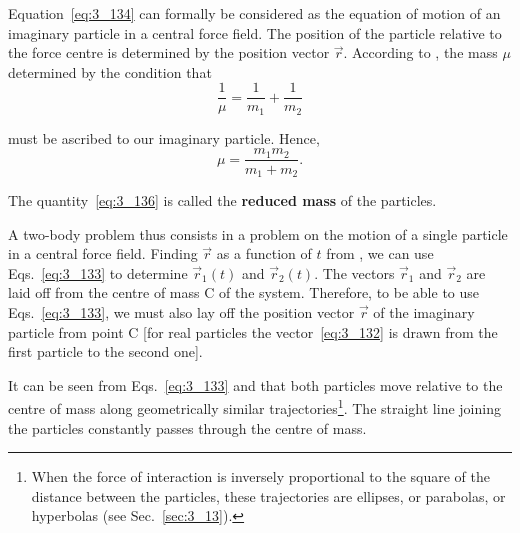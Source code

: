 \noindent
Equation~\eqref{eq:3_134} can formally be considered as the equation of motion of an imaginary particle in a central force field. The position of the particle relative to the force centre is determined by the position vector $\vec{r}$. According to , the mass $\mu$ determined by the condition that
\begin{equation}\label{eq:3_135}
\frac{1}{\mu} = \frac{1}{m_1} + \frac{1}{m_2}
\end{equation}

\noindent
must be ascribed to our imaginary particle. Hence,
\begin{equation}\label{eq:3_136}
\mu = \frac{m_1m_2}{m_1+m_2}.
\end{equation}

\noindent
The quantity~\eqref{eq:3_136} is called the \textbf{reduced mass} of the particles.

A two-body problem thus consists in a problem on the motion of a single particle in a central force field. Finding $\vec{r}$ as a function of $t$ from , we can use Eqs.~\eqref{eq:3_133} to determine $\vec{r}_1(t)$ and $\vec{r}_2(t)$. The vectors $\vec{r}_1$ and $\vec{r}_2$ are laid off from the centre of mass C of the system. Therefore, to be able to use Eqs.~\eqref{eq:3_133}, we must also lay off the position vector $\vec{r}$ of the imaginary particle from point C [for real particles the vector~\eqref{eq:3_132} is drawn from the first particle to the second one].

It can be seen from Eqs.~\eqref{eq:3_133} and  that both particles move relative to the centre of mass along geometrically similar trajectories\footnote{When the force of interaction is inversely proportional to the square of the distance between the particles, these trajectories are ellipses, or parabolas, or hyperbolas (see Sec.~\ref{sec:3_13}).}. The straight line joining the particles constantly passes through the centre of mass.
